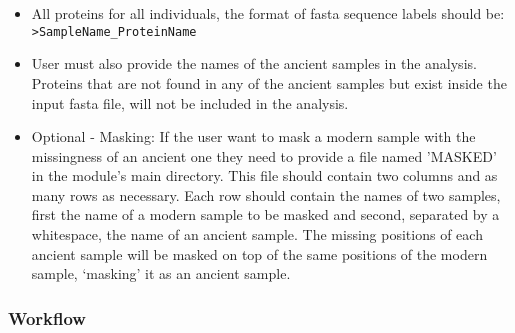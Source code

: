 \documentclass{book}
\begin{document}
\begin{itemize}
\item All proteins for all individuals, the format of fasta sequence labels should be: \verb| >SampleName_ProteinName|
\item User must also provide the names of the ancient samples in the analysis. Proteins that are not found in any of the ancient samples but exist inside the input fasta file, will not be included in the analysis.

\item Optional - Masking: If the user want to mask a modern sample with the missingness of an ancient one they need to provide a file named 'MASKED' in the module's main directory. This file should contain two columns and as many rows as necessary. Each row should contain the names of two samples, first the name of a modern sample to be masked and second, separated by a whitespace, the name of an ancient sample. The missing positions of each ancient sample will be masked on top of the same positions of the modern sample, ‘masking’ it as an ancient sample. 

\end{itemize}

\subsubsection{Workflow}
\end{document}
